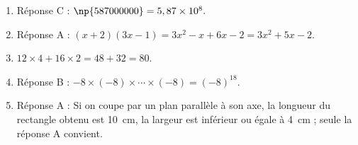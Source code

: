 
\medskip

%
\begin{enumerate}
\item Réponse C : $\np{587000000} = 5,87 \times 10^8.$
\item Réponse A : $(x + 2)(3x - 1) = 3x^2 - x + 6x - 2 = 3x^2 + 5x - 2$.
\item $12 \times 4 + 16 \times 2 = 48 + 32 = 80$.
\item Réponse B : $- 8 \times (- 8) \times \cdots \times(- 8) =  (- 8)^{18}$.
\item Réponse A : Si on coupe par un plan parallèle à son axe, la longueur du
rectangle obtenu est 10~cm, la largeur est inférieur ou égale à 4~cm ; seule la réponse A
convient.
\end{enumerate}

\vspace{0,5cm}

